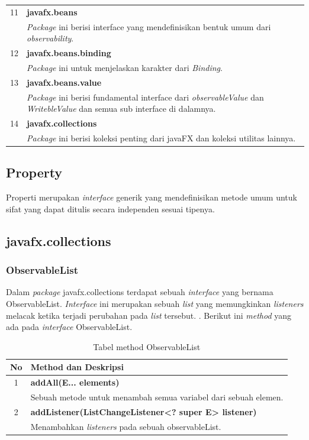 \begin{table}[H]
\begin{tabular}{|c|p{12cm}|}
		11 & \textbf{javafx.beans}\\
			&	\textit{Package} ini berisi interface yang mendefinisikan bentuk umum dari \textit{observability}.\\ \hline
		12 & \textbf{javafx.beans.binding}\\
			&	\textit{Package} ini untuk menjelaskan karakter dari \textit{Binding}.\\ \hline	
		13 & \textbf{javafx.beans.value}\\
			&	\textit{Package} ini berisi fundamental interface dari \textit{observableValue} dan \textit{WritebleValue} dan semua sub interface di dalamnya.\\ \hline
		14 & \textbf{javafx.collections}\\
				&	\textit{Package} ini berisi koleksi penting dari javaFX dan koleksi utilitas lainnya.\\ \hline						
	\end{tabular}
\end{table}
\subsection{Property}
Properti merupakan \textit{interface} generik yang mendefinisikan metode umum untuk sifat yang dapat ditulis secara independen sesuai tipenya.\cite{javafx3}
\subsection{javafx.collections}
\subsubsection{ObservableList}
Dalam \textit{package} javafx.collections terdapat sebuah \textit{interface} yang bernama ObservableList. \textit{Interface} ini merupakan sebuah \textit{list} yang memungkinkan \textit{listeners} melacak ketika terjadi perubahan pada \textit{list} tersebut.
. Berikut ini \textit{method} yang ada pada \textit{interface} ObservableList.\cite{javafx3}
\begin{table}[H]
		\centering
		\caption{Tabel method ObservableList}
		\label{tab:method_ObservableList}
	\begin{tabular}{|c|p{12cm}|}
		\hline
		\textbf{No} & \textbf{Method dan Deskripsi} \\ \hline \hline
		1 & \textbf{addAll(E... elements)}\\
			&	Sebuah metode untuk menambah semua variabel dari sebuah elemen.\\ \hline
		2 & \textbf{addListener(ListChangeListener<? super E> listener)}\\
			&	Menambahkan \textit{listeners} pada sebuah observableList.\\ \hline
	\end{tabular}
\end{table}

